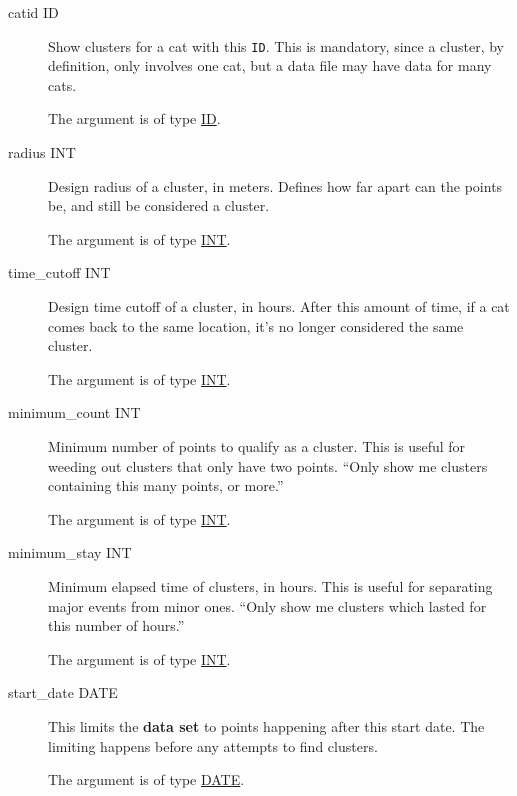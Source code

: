 \begin{description}
\item[catid ID]
\hypertarget{cluster-catid}{}

Show clusters for a cat with this \texttt{ID}. This is mandatory, since
a cluster, by definition, only involves one cat, but a data file may
have data for many cats.

The argument is of type \hyperlink{argument-type-id}{ID}.

\item[radius INT]
\hypertarget{cluster-radius}{}

Design radius of a cluster, in meters. Defines how far apart can the
points be, and still be considered a cluster.

The argument is of type \hyperlink{argument-type-int}{INT}.

\item[time\_cutoff INT]
\hypertarget{cluster-time-cutoff}{}

Design time cutoff of a cluster, in hours. After this amount of time,
if a cat comes back to the same location, it's no longer considered
the same cluster.

The argument is of type \hyperlink{argument-type-int}{INT}.

\item[minimum\_count INT]
\hypertarget{cluster-minimum-count}{}

Minimum number of points to qualify as a cluster. This is useful for
weeding out clusters that only have two points. ``Only show me
clusters containing this many points, or more.''

The argument is of type \hyperlink{argument-type-int}{INT}.

\item[minimum\_stay INT]
\hypertarget{cluster-minimum-stay}{}

Minimum elapsed time of clusters, in hours. This is useful for
separating major events from minor ones. ``Only show me clusters
which lasted for this number of hours.''

The argument is of type \hyperlink{argument-type-int}{INT}.

\item[start\_date DATE]
\hypertarget{cluster-start-date}{}

This limits the \textbf{data set} to points happening after this start
date. The limiting happens before any attempts to find clusters.

The argument is of type \hyperlink{argument-type-date}{DATE}.


\end{description}
